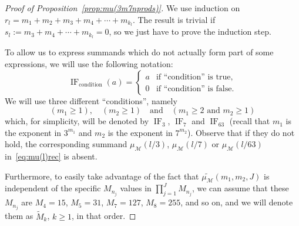 \documentclass[11pt, a4paper]{article}
\newcommand{\calM}{\mathcal{M}}
\newcommand{\muM}{\mu_\calM}
\newcommand{\IF}{\operatorname{IF}}
\theoremstyle{plain}
\theoremstyle{definition}
\begin{document}
\begin{proof}[Proof of Proposition~\ref{prop:mu(3m7nprods)}]
We use induction on $r_l = m_1 + m_2 + m_3 + m_4 + \cdots + m_{k_l}$.
The result is trivial if $s_l := m_3 + m_4 + \cdots + m_{k_l} = 0$,
so we just have to prove the induction step.

To allow us to express summands which do not actually form part of some expressions, we will use the following notation:
\begin{equation}
\label{eq:IF}
  \IF_{\mathrm{condition}}(a) =
  \begin{cases}
  a & \text{if ``condition'' is true},\\
  0 & \text{if ``condition'' is false}.
  \end{cases}
\end{equation}
We will use three different ``conditions'', namely
\[
  (m_1 \ge 1),  \quad (m_2 \ge 1)
  \quad\text{and}\quad (m_1 \ge 2 \text{ and } m_2 \ge 1)
\]
which, for simplicity, will be denoted by $\IF_{3}$, $\IF_{7}$ and $\IF_{63}$ 
(recall that $m_1$ is the exponent in $3^{m_1}$ and $m_2$ is the exponent in $7^{m_2}$).
Observe that if they do not hold, the corresponding summand $\muM(l/3)$, $\muM(l/7)$ or $\muM(l/63)$ in~\eqref{eq:mu(l)rec} is absent. 

Furthermore, to easily take advantage of the fact that $\widetilde{\muM}(m_1,m_2,J)$ is independent of the specific $M_{n_j}$ values in $\prod_{j=1}^J M_{n_j}$, we can assume that these $M_{n_j}$ are $M_4=15$, $M_5=31$, $M_7=127$, $M_8=255$, and so on, and we will denote them as $\widetilde{M}_{k}$, $k \ge 1$, in that order.


\end{proof}
\end{document}
